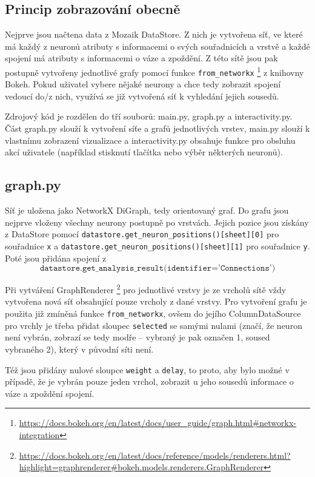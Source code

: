 \documentclass[a4paper,12pt]{article}
\begin{document}
\subsection{Princip zobrazování obecně}
Nejprve jsou načtena data z Mozaik DataStore. Z nich je vytvořena síť, ve které má každý
z neuronů atributy s informacemi o svých souřadnicích a vrstvě a každé spojení má atributy
s informacemi o váze a zpoždění. Z této sítě jsou pak postupně vytvořeny jednotlivé
grafy pomocí funkce \texttt{from\_networkx}
\footnote{\url{https://docs.bokeh.org/en/latest/docs/user_guide/graph.html\#networkx-integration}}
z knihovny Bokeh. Pokud uživatel vybere nějaké neurony a 
chce tedy zobrazit spojení vedoucí do/z nich, využívá se již vytvořená síť k vyhledání jejich sousedů.

Zdrojový kód je rozdělen do tří souborů: main.py, graph.py a interactivity.py. Část graph.py
slouží k vytvoření síťe a grafů jednotlivých vrstev, main.py slouží k vlastnímu zobrazení
vizualizace a interactivity.py obsahuje funkce pro obsluhu akcí uživatele (například stisknutí
tlačítka nebo výběr některých neuronů). 

\subsection{graph.py}
Síť je uložena jako NetworkX DiGraph, tedy orientovaný graf. Do grafu jsou nejprve vloženy
všechny neurony postupně po vrstvách. Jejich pozice jsou získány z DataStore pomocí
\texttt{datastore.get\_neuron\_positions()[sheet][0]} pro souřadnice \texttt{x} a 
\texttt{datastore.get\_neuron\_positions()[sheet][1]} pro sou\-řad\-ni\-ce \texttt{y}.
Poté jsou přidána spojení z 
$$\texttt{datastore.get\_analysis\_result(identifier='Connections')}$$

Při vytváření GraphRenderer
\footnote{\url{https://docs.bokeh.org/en/latest/docs/reference/models/renderers.html?highlight=graphrenderer\#bokeh.models.renderers.GraphRenderer}}
pro jednotlivé vrstvy je ze vrcholů sítě vždy vytvořena nová síť obsahující pouze 
vrcholy z dané vrstvy. Pro vytvoření grafu je použita již zmíněná funkce \texttt{from\_networkx},
ovšem do jejího ColumnDataSource pro vrchly je třeba přidat sloupec \texttt{selected}
se samými nulami (značí, že neuron není vybrán, zobrazí se tedy modře -- vybraný je pak
označen 1, soused vybraného 2), který v původní síti není.

Též jsou přidány nulové sloupce \texttt{weight} a \texttt{delay}, to proto, aby bylo možné
v případě, že je vybrán pouze jeden vrchol, zobrazit u jeho sousedů informace o váze a zpoždění
spojení.
\end{document}
